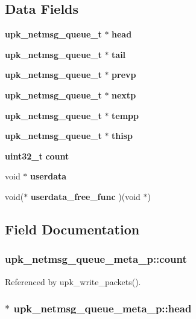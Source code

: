 \subsection*{Data Fields}
\begin{DoxyCompactItemize}
\item 
{\bf upk\_\-netmsg\_\-queue\_\-t} $\ast$ {\bf head}
\item 
{\bf upk\_\-netmsg\_\-queue\_\-t} $\ast$ {\bf tail}
\item 
{\bf upk\_\-netmsg\_\-queue\_\-t} $\ast$ {\bf prevp}
\item 
{\bf upk\_\-netmsg\_\-queue\_\-t} $\ast$ {\bf nextp}
\item 
{\bf upk\_\-netmsg\_\-queue\_\-t} $\ast$ {\bf tempp}
\item 
{\bf upk\_\-netmsg\_\-queue\_\-t} $\ast$ {\bf thisp}
\item 
{\bf uint32\_\-t} {\bf count}
\item 
void $\ast$ {\bf userdata}
\item 
void($\ast$ {\bf userdata\_\-free\_\-func} )(void $\ast$)
\end{DoxyCompactItemize}


\subsection{Field Documentation}
\subsubsection[{count}]{ {\bf upk\_\-netmsg\_\-queue\_\-meta\_\-p::count}}\label{structupk__netmsg__queue__meta__p_a5946fa6357f742c6ab3186377668312e}


Referenced by upk\_\-write\_\-packets().

\subsubsection[{head}]{ $\ast$ {\bf upk\_\-netmsg\_\-queue\_\-meta\_\-p::head}}\label{structupk__netmsg__queue__meta__p_abcb9a5d38c1b1d54eb9256ec4dc514ed}
